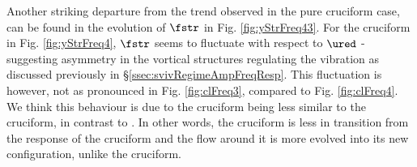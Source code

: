 \documentclass[a4paper,fleqn]{cas-sc}
\begin{document}
Another striking departure from the trend observed in the pure cruciform case, can be found in the evolution of $\fstr$ in Fig. \ref{fig:yStrFreq43}. For the \angfo{} cruciform in Fig. \ref{fig:yStrFreq4}, $\fstr$ seems to fluctuate with respect to $\ured$ - suggesting asymmetry in the vortical structures regulating the vibration as discussed previously in \S\ref{ssec:svivRegimeAmpFreqResp}. This fluctuation is however, not as pronounced in Fig. \ref{fig:clFreq3}, compared to Fig. \ref{fig:clFreq4}. We think this behaviour is due to the \angth{} cruciform being less similar to the \angfi{} cruciform, in contrast to \angfo{}. In other words, the \angth{} cruciform is less in transition from the response of the \angfi{} cruciform and the flow around it is more evolved into its new configuration, unlike the \angfo{} cruciform.
\end{document}
